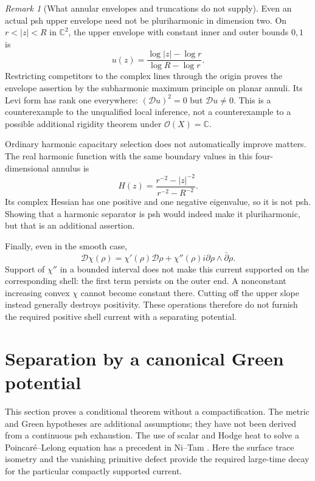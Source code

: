 \documentclass[11pt]{article}
\theoremstyle{remark}
\newtheorem{remark}[theorem]{Remark}
\newcommand{\D}{\mathcal D}
\begin{document}
\begin{remark}[What annular envelopes and truncations do not supply]
Even an actual psh upper envelope need not be pluriharmonic in
dimension two. On $r<|z|<R$ in $\mathbb C^2$, the upper envelope
with constant inner and outer bounds $0,1$ is
\[
 u(z)=\frac{\log|z|-\log r}{\log R-\log r}.
\]
Restricting competitors to the complex lines through the origin
proves the envelope assertion by the subharmonic maximum
principle on planar annuli. Its Levi form has rank one everywhere:
$(\D u)^2=0$ but $\D u\ne0$. This is a counterexample to the
unqualified local inference, not a counterexample to a possible
additional rigidity theorem under $\mathcal O(X)=\mathbb C$.

Ordinary harmonic capacitary selection does not automatically
improve matters. The real harmonic function with the same
boundary values in this four-dimensional annulus is
\[
 H(z)=\frac{r^{-2}-|z|^{-2}}{r^{-2}-R^{-2}}.
\]
Its complex Hessian has one positive and one negative eigenvalue,
so it is not psh. Showing that a harmonic separator is psh would
indeed make it pluriharmonic, but that is an additional assertion.

Finally, even in the smooth case,
\[
 \D\chi(\rho)=\chi'(\rho)\D\rho
       +\chi''(\rho)i\partial\rho\wedge\bar\partial\rho.
\]
Support of $\chi''$ in a bounded interval does not make this
current supported on the corresponding shell: the first term
persists on the outer end. A nonconstant increasing convex
$\chi$ cannot become constant there. Cutting off the upper
slope instead generally destroys positivity. These operations
therefore do not furnish the required positive shell current
with a separating potential.
\end{remark}



\section{Separation by a canonical Green potential}\label{sec:separation-green}
This section proves a conditional theorem without a compactification.
The metric and Green hypotheses are additional assumptions; they have
not been derived from a continuous psh exhaustion.
The use of scalar and Hodge heat to solve a Poincar\'e--Lelong equation
has a precedent in Ni--Tam \cite[\S2]{NiTam}. Here the surface trace
isometry and the vanishing primitive defect provide the required
large-time decay for the particular compactly supported current.
\end{document}
